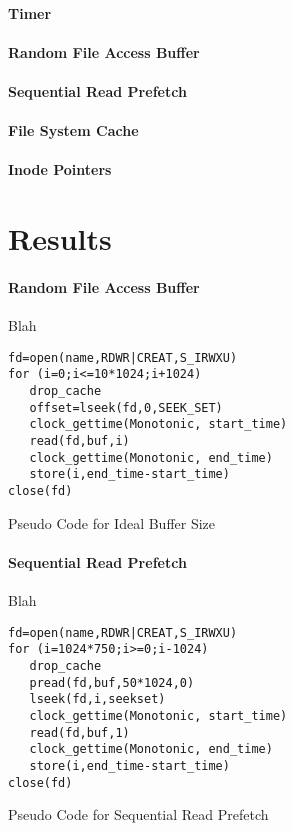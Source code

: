 \documentclass[a4paper,10pt,twocolumn]{article}
\begin{document}
\paragraph{Timer} 
\paragraph{Random File Access Buffer}

\paragraph{Sequential Read Prefetch}
\paragraph{File System Cache}
\paragraph{Inode Pointers}
\section{Results}
\paragraph{Random File Access Buffer}
Blah
\begin{program}
  \begin{verbatim}
fd=open(name,RDWR|CREAT,S_IRWXU)
for (i=0;i<=10*1024;i+1024)
   drop_cache   
   offset=lseek(fd,0,SEEK_SET)       
   clock_gettime(Monotonic, start_time)
   read(fd,buf,i)
   clock_gettime(Monotonic, end_time)
   store(i,end_time-start_time)    
close(fd)
\end{verbatim}
  \caption{Pseudo Code for Ideal Buffer Size}
\end{program}

%

\paragraph{Sequential Read Prefetch}
Blah
\begin{program}
  \begin{verbatim}
fd=open(name,RDWR|CREAT,S_IRWXU)
for (i=1024*750;i>=0;i-1024)
   drop_cache   
   pread(fd,buf,50*1024,0)
   lseek(fd,i,seekset)       
   clock_gettime(Monotonic, start_time)
   read(fd,buf,1)
   clock_gettime(Monotonic, end_time)
   store(i,end_time-start_time)    
close(fd)
\end{verbatim}
  \caption{Pseudo Code for Sequential Read Prefetch}
\end{program}
\end{document}
